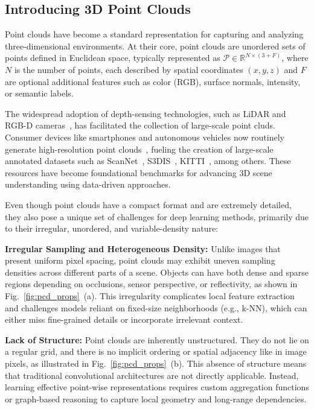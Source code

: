 \subsection{Introducing 3D Point Clouds}

Point clouds have become a standard representation for capturing and analyzing
three-dimensional environments. At their core, point clouds are unordered sets
of points defined in Euclidean space, typically represented as $\mathcal{P} \in
    \mathbb{R}^{N \times (3 + F)}$, where $N$ is the number of points, each
described by spatial coordinates $(x, y, z)$ and $F$ are optional additional
features such as color (RGB), surface normals, intensity, or semantic labels.

The widespread adoption of depth-sensing technologies, such as LiDAR and RGB-D
cameras~\cite{alexiadis2014fast,song2016robust}, has facilitated the collection
of large-scale point cluds.
%
Consumer devices like smartphones and autonomous vehicles now routinely
generate high-resolution point clouds~\cite{li2020lidar}, fueling the creation
of large-scale annotated datasets such as ScanNet~\cite{dai2017scannet},
S3DIS~\cite{armeni20163d}, KITTI~\cite{behley2019semantickitti}, among others.
These resources have become foundational benchmarks for advancing 3D scene
understanding using data-driven approaches.

Even though point clouds have a compact format and are extremely detailed, they
also pose a unique set of challenges for deep learning methods, primarily due
to their irregular, unordered, and variable-density nature:

\textbf{Irregular Sampling and Heterogeneous Density:} Unlike images that
present uniform pixel spacing, point clouds may exhibit uneven sampling densities across different
parts of a scene. Objects can have both dense and sparse regions depending on
occlusions, sensor perspective, or reflectivity, as shown in Fig.~\ref{fig:pcd_props}~(a).
This irregularity complicates local feature extraction and challenges models
reliant on fixed-size neighborhoods (e.g., k-NN), which can either miss fine-grained details or
incorporate irrelevant context.

\textbf{Lack of Structure:} Point clouds are inherently unstructured.
They do not lie on a regular grid, and there is no implicit ordering or spatial
adjacency like in image pixels, as illustrated in Fig.~\ref{fig:pcd_props}~(b).
This absence of structure means that traditional convolutional architectures
are not directly applicable.
Instead, learning effective point-wise representations requires custom
aggregation functions or graph-based reasoning to capture local geometry
and long-range dependencies.

